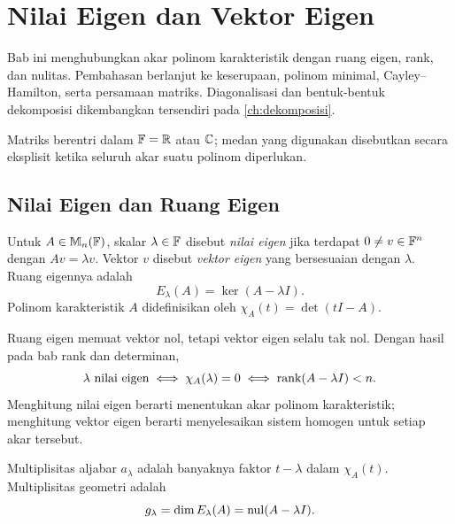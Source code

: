 \chapter{Nilai Eigen dan Vektor Eigen}
\label{ch:eigen}

Bab ini menghubungkan akar polinom karakteristik dengan ruang eigen,
rank, dan nulitas. Pembahasan berlanjut ke keserupaan, polinom minimal,
Cayley--Hamilton, serta persamaan matriks. Diagonalisasi dan bentuk-bentuk
dekomposisi dikembangkan tersendiri pada \autoref{ch:dekomposisi}.

Matriks berentri dalam $\mathbb{F}=\mathbb{R}$ atau $\mathbb{C}$; medan yang digunakan disebutkan
secara eksplisit ketika seluruh akar suatu polinom diperlukan.

\section{Nilai Eigen dan Ruang Eigen}
\label{eigen:dasar}

\begin{definisi}
    Untuk $A\in\mathbb{M}_n(\mathbb{F})$, skalar $\lambda\in\mathbb{F}$ disebut
    \emph{nilai eigen} jika terdapat $0\ne v\in\mathbb{F}^n$ dengan
    $Av=\lambda v$. Vektor $v$ disebut \emph{vektor eigen} yang
    bersesuaian dengan $\lambda$. Ruang eigennya adalah
    \[
        E_\lambda(A)=\ker(A-\lambda I).
    \]
    Polinom karakteristik $A$ didefinisikan oleh
    $\chi_A(t)=\det(tI-A)$.
\end{definisi}

Ruang eigen memuat vektor nol, tetapi vektor eigen selalu tak nol.
Dengan hasil pada bab rank dan determinan,
\[
    \lambda\text{ nilai eigen}
    \iff\chi_A(\lambda)=0
    \iff\operatorname{rank}(A-\lambda I)<n.
\]
Menghitung nilai eigen berarti menentukan akar polinom karakteristik;
menghitung vektor eigen berarti menyelesaikan sistem homogen untuk
setiap akar tersebut.

\begin{definisi}
    Multiplisitas aljabar $a_\lambda$ adalah banyaknya faktor
    $t-\lambda$ dalam $\chi_A(t)$. Multiplisitas geometri adalah
    \[
        g_\lambda=\dim E_\lambda(A)=\operatorname{nul}(A-\lambda I).
    \]
\end{definisi}

